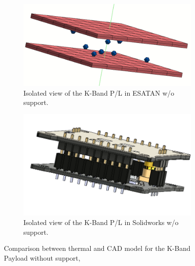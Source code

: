 \begin{figure}[H]
  \centering
  \begin{subfigure}{.5\textwidth}
    \centering
    \includegraphics[width=.6\linewidth]{res/img/5_simulationanalisys/Comparisons/ESATAN/kband_raw.PNG}
    \caption{Isolated view of the K-Band P/L in ESATAN w/o support.}
    \label{fig:kbandraw}
  \end{subfigure}%
  \begin{subfigure}{.5\textwidth}
    \centering
    \includegraphics[width=.5\linewidth]{res/img/5_simulationanalisys/Comparisons/SLDW/kbandraw_solid.PNG}
    \caption{Isolated view of the K-Band P/L in Solidworks w/o support.}
    \label{fig:kbandrawsolid}
  \end{subfigure}
  \caption{Comparison between thermal and CAD model for the K-Band Payload without support,}
  \label{fig:kbandrawim}
\end{figure}

